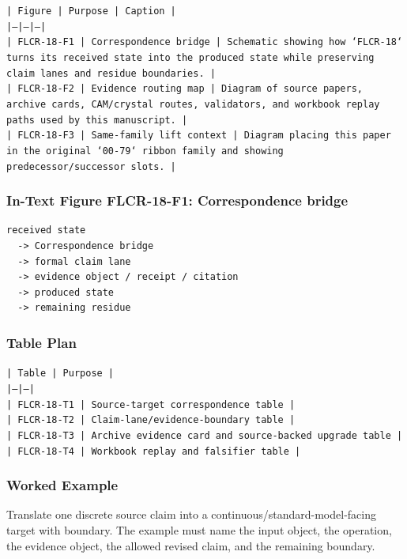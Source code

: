 \documentclass[11pt]{article}
\begin{document}
\noindent\texttt{| Figure | Purpose | Caption |}\\
\noindent\texttt{|---|---|---|}\\
\noindent\texttt{| FLCR-18-F1 | Correspondence bridge | Schematic showing how `FLCR-18` turns its received state into the produced state while preserving claim lanes and residue boundaries. |}\\
\noindent\texttt{| FLCR-18-F2 | Evidence routing map | Diagram of source papers, archive cards, CAM/crystal routes, validators, and workbook replay paths used by this manuscript. |}\\
\noindent\texttt{| FLCR-18-F3 | Same-family lift context | Diagram placing this paper in the original `00-79` ribbon family and showing predecessor/successor slots. |}\\

\subsubsection*{In-Text Figure FLCR-18-F1: Correspondence bridge}

\begin{verbatim}
received state
  -> Correspondence bridge
  -> formal claim lane
  -> evidence object / receipt / citation
  -> produced state
  -> remaining residue
\end{verbatim}

\subsubsection*{Table Plan}

\noindent\texttt{| Table | Purpose |}\\
\noindent\texttt{|---|---|}\\
\noindent\texttt{| FLCR-18-T1 | Source-target correspondence table |}\\
\noindent\texttt{| FLCR-18-T2 | Claim-lane/evidence-boundary table |}\\
\noindent\texttt{| FLCR-18-T3 | Archive evidence card and source-backed upgrade table |}\\
\noindent\texttt{| FLCR-18-T4 | Workbook replay and falsifier table |}\\

\subsubsection*{Worked Example}

Translate one discrete source claim into a continuous/standard-model-facing target with boundary. The example must name the input object, the operation,
the evidence object, the allowed revised claim, and the remaining boundary.
\end{document}

